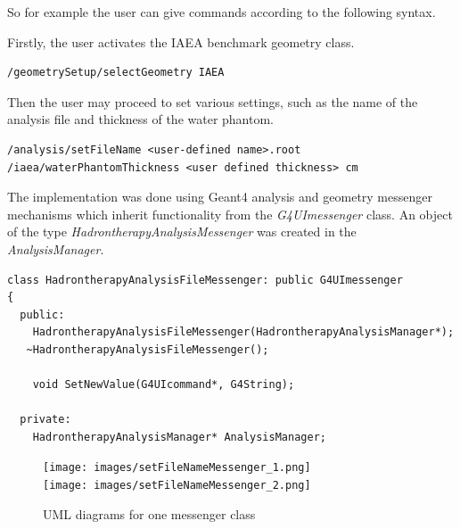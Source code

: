 So for example the user can give commands according to the following syntax.

Firstly, the user activates the IAEA benchmark geometry class.
\scriptsize
\begin{verbatim}
/geometrySetup/selectGeometry IAEA
\end{verbatim}
\normalsize
Then the user may proceed to set various settings, such as the name of the analysis file and thickness of the water phantom.
\scriptsize
\begin{verbatim}
/analysis/setFileName <user-defined name>.root
/iaea/waterPhantomThickness <user defined thickness> cm
\end{verbatim}
\normalsize

The implementation was done using Geant4 analysis and geometry messenger mechanisms which inherit functionality from the \textit{G4UImessenger} class. An object of the type \textit{HadrontherapyAnalysisMessenger} was created in the \textit{AnalysisManager}.


\scriptsize
\begin{verbatim}
class HadrontherapyAnalysisFileMessenger: public G4UImessenger
{
  public:
    HadrontherapyAnalysisFileMessenger(HadrontherapyAnalysisManager*);
   ~HadrontherapyAnalysisFileMessenger();
    
    void SetNewValue(G4UIcommand*, G4String);
    
  private:
    HadrontherapyAnalysisManager* AnalysisManager;
\end{verbatim}
\normalsize
\begin{figure}[!h] 
\begin{center}
\texttt{[image: images/setFileNameMessenger\_1.png]}  
\\
\texttt{[image: images/setFileNameMessenger\_2.png]}  
\caption{\label{fig:messengerUML} UML diagrams for one messenger class}
 
 \end{center}
 \end{figure}

\clearpage
\renewcommand{\theequation}{D\arabic{equation}}
\setcounter{equation}{0}  
\renewcommand{\thefigure}{D\arabic{figure}}
\setcounter{figure}{0}
\renewcommand{\thetable}{D\arabic{table}}
\setcounter{table}{0}
\renewcommand{\thesection}{D}
\setcounter{section}{1}
\setcounter{subsection}{0}
